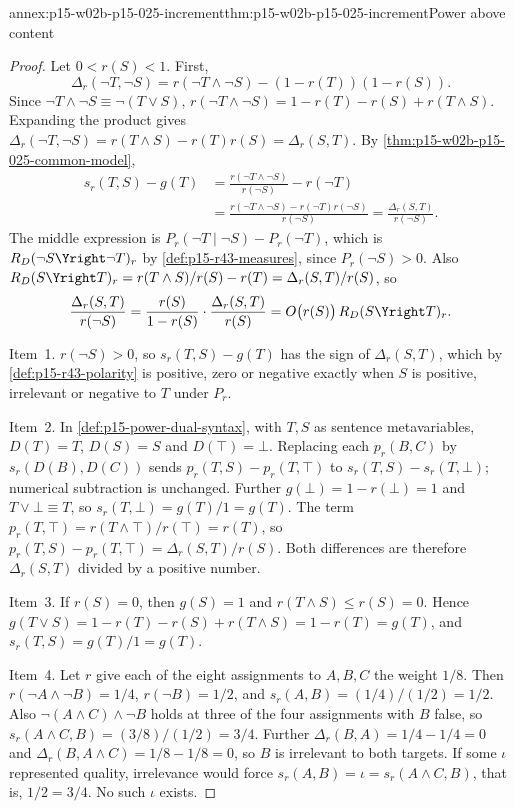 \begin{annexitem}{annex:p15-w02b-p15-025-increment}{thm:p15-w02b-p15-025-increment}{Power above content}
\begin{proof}
Let \(0<r(S)<1\). First,
\[
 \Delta_r(\neg T,\neg S)
 =r(\neg T\wedge\neg S)-(1-r(T))(1-r(S)).
\]
Since \(\neg T\wedge\neg S\equiv\neg(T\vee S)\),
\(r(\neg T\wedge\neg S)=1-r(T)-r(S)+r(T\wedge S)\). Expanding the
product gives \(\Delta_r(\neg T,\neg S)=r(T\wedge S)-r(T)r(S)
=\Delta_r(S,T)\). By \cref{thm:p15-w02b-p15-025-common-model},
\[
 \begin{aligned}
 s_r(T,S)-g(T)&=\frac{r(\neg T\wedge\neg S)}{r(\neg S)}-r(\neg T)\\
 &=\frac{r(\neg T\wedge\neg S)-r(\neg T)r(\neg S)}{r(\neg S)}
 =\frac{\Delta_r(S,T)}{r(\neg S)} .
 \end{aligned}
\]
The middle expression is \(P_r(\neg T\mid\neg S)-P_r(\neg T)\), which
is \(R_D(\neg S\Yright\neg T)_r\) by \cref{def:p15-r43-measures}, since
\(P_r(\neg S)>0\). Also
\(R_D(S\Yright T)_r=r(T\wedge S)/r(S)-r(T)=\Delta_r(S,T)/r(S)\), so
\[
 \frac{\Delta_r(S,T)}{r(\neg S)}
 =\frac{r(S)}{1-r(S)}\cdot\frac{\Delta_r(S,T)}{r(S)}
 =O\bigl(r(S)\bigr)\,R_D(S\Yright T)_r .
\]

Item~1. \(r(\neg S)>0\), so \(s_r(T,S)-g(T)\) has the sign of
\(\Delta_r(S,T)\), which by \cref{def:p15-r43-polarity} is positive,
zero or negative exactly when \(S\) is positive, irrelevant or negative
to \(T\) under \(P_r\).

Item~2. In \cref{def:p15-power-dual-syntax}, with \(T,S\) as sentence
metavariables, \(D(T)=T\), \(D(S)=S\) and \(D(\top)=\bot\). Replacing
each \(p_r(B,C)\) by \(s_r(D(B),D(C))\) sends
\(p_r(T,S)-p_r(T,\top)\) to \(s_r(T,S)-s_r(T,\bot)\); numerical
subtraction is unchanged. Further \(g(\bot)=1-r(\bot)=1\) and
\(T\vee\bot\equiv T\), so \(s_r(T,\bot)=g(T)/1=g(T)\). The term
\(p_r(T,\top)=r(T\wedge\top)/r(\top)=r(T)\), so
\(p_r(T,S)-p_r(T,\top)=\Delta_r(S,T)/r(S)\). Both differences are
therefore \(\Delta_r(S,T)\) divided by a positive number.

Item~3. If \(r(S)=0\), then \(g(S)=1\) and \(r(T\wedge S)\le r(S)=0\).
Hence \(g(T\vee S)=1-r(T)-r(S)+r(T\wedge S)=1-r(T)=g(T)\), and
\(s_r(T,S)=g(T)/1=g(T)\).

Item~4. Let \(r\) give each of the eight assignments to \(A,B,C\) the
weight \(1/8\). Then \(r(\neg A\wedge\neg B)=1/4\), \(r(\neg B)=1/2\),
and \(s_r(A,B)=(1/4)/(1/2)=1/2\). Also
\(\neg(A\wedge C)\wedge\neg B\) holds at three of the four assignments
with \(B\) false, so \(s_r(A\wedge C,B)=(3/8)/(1/2)=3/4\). Further
\(\Delta_r(B,A)=1/4-1/4=0\) and \(\Delta_r(B,A\wedge C)=1/8-1/8=0\), so
\(B\) is irrelevant to both targets. If some \(\iota\) represented
quality, irrelevance would force \(s_r(A,B)=\iota=s_r(A\wedge C,B)\),
that is, \(1/2=3/4\). No such \(\iota\) exists.
\end{proof}
\end{annexitem}

